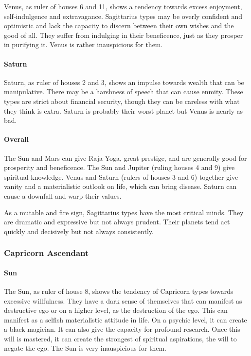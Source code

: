 Venus, as ruler of houses 6 and 11, shows a tendency towards excess enjoyment, self‑indulgence and extravagance. Sagittarius types may be overly confident and optimistic and lack the capacity to discern between their own wishes and the good of all. They suffer from indulging in their beneficence, just as they prosper in purifying it. Venus is rather inauspicious for them.

 

\paragraph{Saturn}

Saturn, as ruler of houses 2 and 3, shows an impulse towards wealth that can be manipulative. There may be a harshness of speech that can cause enmity. These types are strict about financial security, though they can be careless with what they think is extra. Saturn is probably their worst planet but Venus is nearly as bad.

 

\paragraph{Overall}

The Sun and Mars can give Raja Yoga, great prestige, and are generally good for prosperity and beneficence. The Sun and Jupiter (ruling houses 4 and 9) give spiritual knowledge. Venus and Saturn (rulers of houses 3 and 6) together give vanity and a materialistic outlook on life, which can bring disease. Saturn can cause a downfall and warp their values.

 

As a mutable and fire sign, Sagittarius types have the most critical minds. They are dramatic and expressive but not always prudent. Their planets tend act quickly and decisi­vely but not always consistently.

 

\subsubsection{Capricorn Ascendant}
 

\paragraph{Sun}

The Sun, as ruler of house 8, shows the tendency of Capricorn types towards excessive willfulness. They have a dark sense of themselves that can manifest as destructive ego or on a higher level, as the destruction of the ego. This can manifest as a selfish materialistic attitude in life. On a psychic level, it can create a black magician. It can also give the capacity for profound research. Once this will is mastered, it can create the strongest of spiritual aspirations, the will to negate the ego. The Sun is very inauspicious for them.

